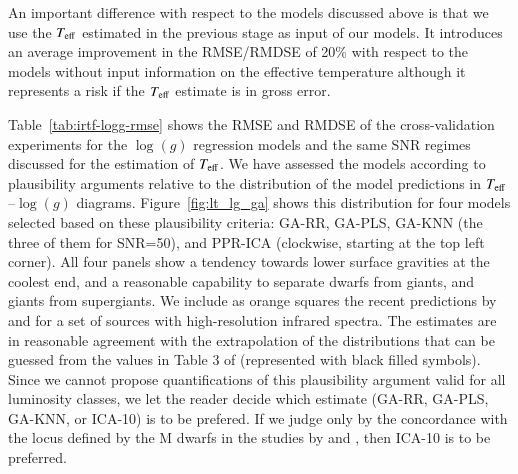 An important difference with respect to the models discussed
above is that we use the $T_{\rm eff}$ estimated in the previous stage
as input of our models. It introduces an average improvement in the
RMSE/RMDSE of 20\% with respect to the models without input
information on the effective temperature although it represents a risk
if the $T_{\rm eff}$ estimate is in gross error.

Table~\ref{tab:irtf-logg-rmse} shows the RMSE and RMDSE of the
cross-validation experiments for the $\log(g)$ regression models and
the same SNR regimes discussed for the estimation of $T_{\rm eff}$. We
have assessed the models according to plausibility arguments relative
to the distribution of the model predictions in $T_{\rm
eff}$--$\log(g)$ diagrams.  Figure~\ref{fig:lt_lg_ga} shows this
distribution for four models selected based on these plausibility
criteria: GA-RR, GA-PLS, GA-KNN (the three of them for SNR=50), and
PPR-ICA (clockwise, starting at the top left corner). All four panels
show a tendency towards lower surface gravities at the coolest end,
and a reasonable capability to separate dwarfs from giants, and giants
from supergiants. We include as orange squares the recent predictions
by \cite{esm1} and \cite{esm2} for a set of sources with
high-resolution infrared spectra. The estimates are in reasonable
agreement with the extrapolation of the distributions that can be
guessed from the values in Table 3 of \cite{cesetti} (represented with
black filled symbols). Since we cannot propose quantifications of this
plausibility argument valid for all luminosity classes, we let the
reader decide which estimate (GA-RR, GA-PLS, GA-KNN, or ICA-10) is to
be prefered. If we judge only by the concordance with the locus
defined by the M dwarfs in the studies by \cite{esm1} and \cite{esm},
then ICA-10 is to be preferred.

